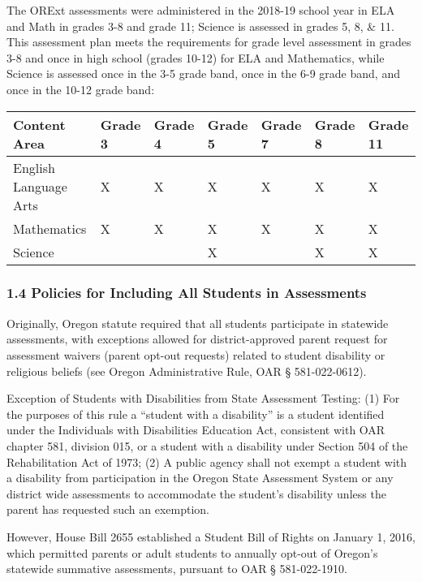 \documentclass[]{article}
\begin{document}
The ORExt assessments were administered in the 2018-19 school year in
ELA and Math in grades 3-8 and grade 11; Science is assessed in grades
5, 8, \& 11. This assessment plan meets the requirements for grade level
assessment in grades 3-8 and once in high school (grades 10-12) for ELA
and Mathematics, while Science is assessed once in the 3-5 grade band,
once in the 6-9 grade band, and once in the 10-12 grade band:

\begin{longtable}[]{@{}lllllll@{}}
\toprule
\textbf{Content Area} & \textbf{Grade 3} & \textbf{Grade 4} &
\textbf{Grade 5} & \textbf{Grade 7} & \textbf{Grade 8} & \textbf{Grade
11}\tabularnewline
\midrule
\endhead
English Language Arts & X & X & X & X & X & X\tabularnewline
Mathematics & X & X & X & X & X & X\tabularnewline
Science & & & X & & X & X\tabularnewline
\bottomrule
\end{longtable}

\hypertarget{policies-for-including-all-students-in-assessments}{%
\subsubsection{1.4 Policies for Including All Students in
Assessments}\label{policies-for-including-all-students-in-assessments}}

Originally, Oregon statute required that all students participate in
statewide assessments, with exceptions allowed for district-approved
parent request for assessment waivers (parent opt-out requests) related
to student disability or religious beliefs (see Oregon Administrative
Rule, OAR § 581-022-0612).

Exception of Students with Disabilities from State Assessment Testing:
(1) For the purposes of this rule a ``student with a disability'' is a
student identified under the Individuals with Disabilities Education
Act, consistent with OAR chapter 581, division 015, or a student with a
disability under Section 504 of the Rehabilitation Act of 1973; (2) A
public agency shall not exempt a student with a disability from
participation in the Oregon State Assessment System or any district wide
assessments to accommodate the student's disability unless the parent
has requested such an exemption.

However, House Bill 2655 established a Student Bill of Rights on January
1, 2016, which permitted parents or adult students to annually opt-out
of Oregon's statewide summative assessments, pursuant to OAR §
581-022-1910.
\end{document}
